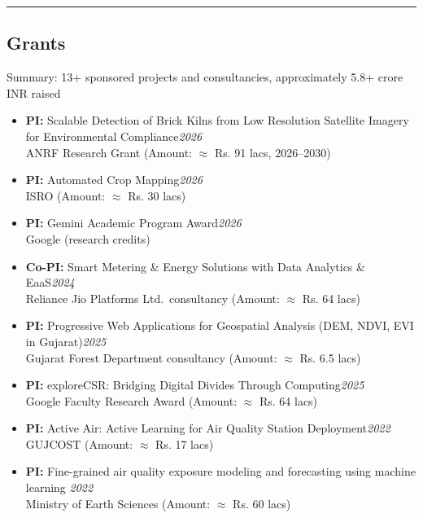 \documentclass[letter,10pt]{article}
\begin{document}
\ifcvshort\else
\vspace{0.5em}
\noindent\rule{\textwidth}{0.5pt}
\vspace{-0.2em}
\fi

\subsection*{\textbf{Grants}}
\vspace{-0.4em}
Summary: 13+ sponsored projects and consultancies, approximately 5.8+ crore INR raised
\begin{itemize}
    \item[]{\textbf{PI: }Scalable Detection of Brick Kilns from Low Resolution Satellite Imagery for Environmental Compliance}\hfill\textit{2026} \\
        ANRF Research Grant (Amount: $\approx$ Rs. 91 lacs, 2026--2030)
    \item[]{\textbf{PI: }Automated Crop Mapping}\hfill\textit{2026} \\
        ISRO (Amount: $\approx$ Rs. 30 lacs)
    \item[]{\textbf{PI: }Gemini Academic Program Award}\hfill\textit{2026} \\
        Google (research credits)
    \item[]{\textbf{Co-PI: }Smart Metering \& Energy Solutions with Data Analytics \& EaaS}\hfill\textit{2024} \\
        Reliance Jio Platforms Ltd.\ consultancy (Amount: $\approx$ Rs. 64 lacs)
    \item[]{\textbf{PI: }Progressive Web Applications for Geospatial Analysis (DEM, NDVI, EVI in Gujarat)}\hfill\textit{2025} \\
        Gujarat Forest Department consultancy (Amount: $\approx$ Rs. 6.5 lacs)
    \item[]{\textbf{PI: }exploreCSR: Bridging Digital Divides Through Computing}\hfill\textit{2025} \\
        Google Faculty Research Award (Amount: $\approx$ Rs. 64 lacs)
 \ifcvshort\else
 \item[]{\textbf{PI: }Active Air: Active Learning for Air Quality Station Deployment}\hfill\textit{2022} \\
        GUJCOST (Amount: $\approx$ Rs. 17 lacs)
 \fi
      \item[]{\textbf{PI: }Fine-grained air quality exposure modeling and forecasting using machine learning }\hfill\textit{2022} \\
        Ministry of Earth Sciences (Amount: $\approx$ Rs. 60 lacs)

\end{itemize}
\end{document}
